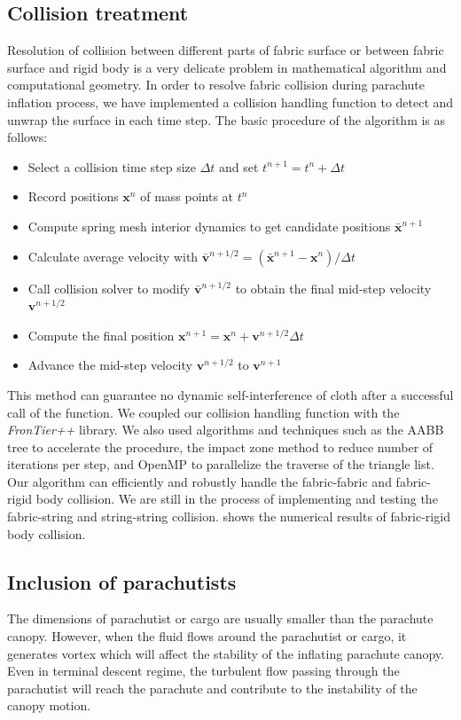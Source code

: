 \subsection{Collision treatment} 
Resolution of collision between different parts of
fabric surface or between fabric surface and rigid body is a very delicate
problem in mathematical algorithm and computational geometry.  In order to
resolve fabric collision during parachute inflation process, we have implemented
a collision handling function to detect and unwrap the surface in each time
step. The basic procedure of the algorithm is as follows:
\begin{itemize}
\item Select a collision time step size $\Delta t$ and set $t^{n+1}=t^{n}+\Delta t$
\item Record positions $\mathbf{x}^n$ of mass points at $t^n$
\item Compute spring mesh interior dynamics to get candidate positions
$\bar{\mathbf{x}}^{n+1}$
\item Calculate average velocity with
$\bar{\mathbf{v}}^{n+1/2} = (\bar{\mathbf{x}}^{n+1}-\mathbf{x}^n)/\Delta t$
\item Call collision solver to modify $\bar{\mathbf{v}}^{n+1/2}$ to obtain the
final mid-step velocity $\mathbf{v}^{n+1/2}$
\item Compute the final position
$\mathbf{x}^{n+1} = \mathbf{x}^n+\mathbf{v}^{n+1/2}\Delta t$
\item Advance the mid-step velocity $\mathbf{v}^{n+1/2}$ to $\mathbf{v}^{n+1}$ \end{itemize}
This method can guarantee no dynamic self-interference of cloth after a successful
call of the function. We coupled our collision handling function with the {\it
FronTier++} library. We also used algorithms and techniques such as the AABB
tree to accelerate the procedure, the impact zone method to reduce number of
iterations per step, and OpenMP to parallelize the traverse of the triangle
list.  Our algorithm can efficiently and robustly handle the fabric-fabric and
fabric-rigid body collision. We are still in the process of implementing and
testing the fabric-string and string-string collision.  
shows the numerical results of fabric-rigid body collision.

\subsection{Inclusion of parachutists} 
The dimensions of parachutist or cargo are usually smaller than the parachute
canopy. However, when the fluid flows around the parachutist or cargo, it
generates vortex which will affect the stability of the inflating parachute
canopy.  Even in terminal descent regime, the turbulent flow passing through
the parachutist will reach the parachute and contribute to the instability of
the canopy motion.

